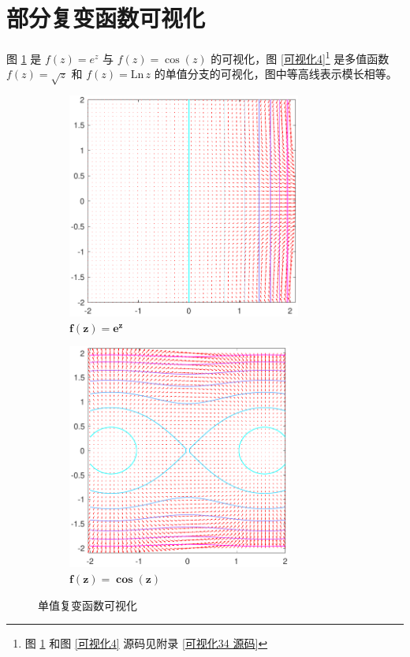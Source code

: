 \documentclass[UTF8]{report}
\def\Ln{\mathrm{Ln\,}}
\theoremstyle{MyLineTheoremStyle} %
\theoremstyle{MyBlockTheoremStyle} %
\theoremstyle{MySubsubsectionStyle} %
\begin{document}
\section{部分复变函数可视化}

图 \ref{可视化3} 是 $f(z) = e^z$ 与 $f(z) = \cos (z)$ 的可视化，图 \ref{可视化4}\footnote{图 \ref{可视化3} 和图 \ref{可视化4} 源码见附录 \ref{可视化34 源码}} 是多值函数 $f(z) = \sqrt{z}$ 和 $f(z) = \Ln z$ 的单值分支的可视化，图中等高线表示模长相等。

\begin{figure}[H]\centering
\begin{subfigure}[t]{0.49\textwidth}\centering
    \includegraphics[height=210pt]{assets/1,2/e^z.pdf}
    \caption{ $\boldsymbol{f(z) = e^z}$ }
\end{subfigure}\begin{subfigure}[t]{0.49\textwidth}\centering
    \includegraphics[height=210pt]{assets/1,2/cos z.pdf}
    \caption{ $\boldsymbol{f(z) = \cos (z)}$ }
\end{subfigure}
\caption{ 单值复变函数可视化 }\label{可视化3}
\end{figure}
\end{document}
